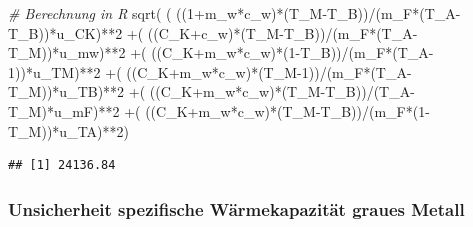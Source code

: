 \documentclass[
  9pt,
]{article}
\newenvironment{Shaded}{\begin{snugshade}}{\end{snugshade}}
\newcommand{\CommentTok}[1]{\textcolor[rgb]{0.56,0.35,0.01}{\textit{#1}}}
\newcommand{\DecValTok}[1]{\textcolor[rgb]{0.00,0.00,0.81}{#1}}
\newcommand{\FunctionTok}[1]{\textcolor[rgb]{0.00,0.00,0.00}{#1}}
\newcommand{\NormalTok}[1]{#1}
\newcommand{\SpecialCharTok}[1]{\textcolor[rgb]{0.00,0.00,0.00}{#1}}
\begin{document}
\begin{Shaded}
\begin{Highlighting}[]
\CommentTok{\# Berechnung in R}
\FunctionTok{sqrt}\NormalTok{( ( ((}\DecValTok{1}\SpecialCharTok{+}\NormalTok{m\_w}\SpecialCharTok{*}\NormalTok{c\_w)}\SpecialCharTok{*}\NormalTok{(T\_M}\SpecialCharTok{{-}}\NormalTok{T\_B))}\SpecialCharTok{/}\NormalTok{(m\_F}\SpecialCharTok{*}\NormalTok{(T\_A}\SpecialCharTok{{-}}\NormalTok{T\_B))}\SpecialCharTok{*}\NormalTok{u\_CK)}\SpecialCharTok{**}\DecValTok{2}
     \SpecialCharTok{+}\NormalTok{( ((C\_K}\SpecialCharTok{+}\NormalTok{c\_w)}\SpecialCharTok{*}\NormalTok{(T\_M}\SpecialCharTok{{-}}\NormalTok{T\_B))}\SpecialCharTok{/}\NormalTok{(m\_F}\SpecialCharTok{*}\NormalTok{(T\_A}\SpecialCharTok{{-}}\NormalTok{T\_M))}\SpecialCharTok{*}\NormalTok{u\_mw)}\SpecialCharTok{**}\DecValTok{2}
     \SpecialCharTok{+}\NormalTok{( ((C\_K}\SpecialCharTok{+}\NormalTok{m\_w}\SpecialCharTok{*}\NormalTok{c\_w)}\SpecialCharTok{*}\NormalTok{(}\DecValTok{1}\SpecialCharTok{{-}}\NormalTok{T\_B))}\SpecialCharTok{/}\NormalTok{(m\_F}\SpecialCharTok{*}\NormalTok{(T\_A}\DecValTok{{-}1}\NormalTok{))}\SpecialCharTok{*}\NormalTok{u\_TM)}\SpecialCharTok{**}\DecValTok{2}
     \SpecialCharTok{+}\NormalTok{( ((C\_K}\SpecialCharTok{+}\NormalTok{m\_w}\SpecialCharTok{*}\NormalTok{c\_w)}\SpecialCharTok{*}\NormalTok{(T\_M}\DecValTok{{-}1}\NormalTok{))}\SpecialCharTok{/}\NormalTok{(m\_F}\SpecialCharTok{*}\NormalTok{(T\_A}\SpecialCharTok{{-}}\NormalTok{T\_M))}\SpecialCharTok{*}\NormalTok{u\_TB)}\SpecialCharTok{**}\DecValTok{2}
     \SpecialCharTok{+}\NormalTok{( ((C\_K}\SpecialCharTok{+}\NormalTok{m\_w}\SpecialCharTok{*}\NormalTok{c\_w)}\SpecialCharTok{*}\NormalTok{(T\_M}\SpecialCharTok{{-}}\NormalTok{T\_B))}\SpecialCharTok{/}\NormalTok{(T\_A}\SpecialCharTok{{-}}\NormalTok{T\_M)}\SpecialCharTok{*}\NormalTok{u\_mF)}\SpecialCharTok{**}\DecValTok{2}
     \SpecialCharTok{+}\NormalTok{( ((C\_K}\SpecialCharTok{+}\NormalTok{m\_w}\SpecialCharTok{*}\NormalTok{c\_w)}\SpecialCharTok{*}\NormalTok{(T\_M}\SpecialCharTok{{-}}\NormalTok{T\_B))}\SpecialCharTok{/}\NormalTok{(m\_F}\SpecialCharTok{*}\NormalTok{(}\DecValTok{1}\SpecialCharTok{{-}}\NormalTok{T\_M))}\SpecialCharTok{*}\NormalTok{u\_TA)}\SpecialCharTok{**}\DecValTok{2}\NormalTok{)}
\end{Highlighting}
\end{Shaded}

\begin{verbatim}
## [1] 24136.84
\end{verbatim}

\hypertarget{unsicherheit-spezifische-wuxe4rmekapazituxe4t-graues-metall}{%
\subsubsection{Unsicherheit spezifische Wärmekapazität graues
Metall}\label{unsicherheit-spezifische-wuxe4rmekapazituxe4t-graues-metall}}
\end{document}
